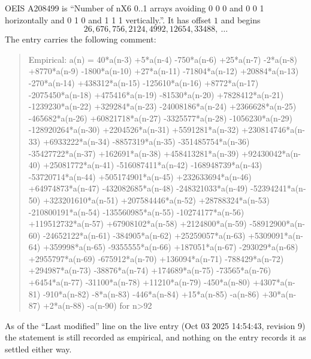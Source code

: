 \documentclass[11pt,a4paper]{article}
\theoremstyle{plain}
\theoremstyle{definition}
\begin{document}
OEIS A208499 is ``Number of nX6 0..1 arrays avoiding 0 0 0 and 0 0 1 horizontally and 0 1 0 and 1 1 1 vertically.''. It has offset
$1$ and begins
\[
26, 676, 756, 2124, 4992, 12654, 33488,\ \dots
\]
The entry carries the following comment:
\begin{quote}\small
Empirical: a(n) = 40*a(n-3) +5*a(n-4) -750*a(n-6) +25*a(n-7) -2*a(n-8) +8770*a(n-9) -1800*a(n-10) +27*a(n-11) -71804*a(n-12) +20884*a(n-13) -270*a(n-14) +438312*a(n-15) -125610*a(n-16) +8772*a(n-17) -2075450*a(n-18) +475416*a(n-19) -81530*a(n-20) +7828412*a(n-21) -1239230*a(n-22) +329284*a(n-23) -24008186*a(n-24) +2366628*a(n-25) -465682*a(n-26) +60821718*a(n-27) -3325577*a(n-28) -1056230*a(n-29) -128920264*a(n-30) +2204526*a(n-31) +5591281*a(n-32) +230814746*a(n-33) +6933222*a(n-34) -8857319*a(n-35) -351485754*a(n-36) -35427722*a(n-37) +162691*a(n-38) +458413281*a(n-39) +92430042*a(n-40) +25081772*a(n-41) -516087411*a(n-42) -168948739*a(n-43) -53720714*a(n-44) +505174901*a(n-45) +232633694*a(n-46) +64974873*a(n-47) -432082685*a(n-48) -248321033*a(n-49) -52394241*a(n-50) +323201610*a(n-51) +207584446*a(n-52) +28788324*a(n-53) -210800191*a(n-54) -135560985*a(n-55) -10274177*a(n-56) +119512732*a(n-57) +67908102*a(n-58) +2124800*a(n-59) -58912900*a(n-60) -24652122*a(n-61) -384905*a(n-62) +25259057*a(n-63) +5309091*a(n-64) +359998*a(n-65) -9355555*a(n-66) +187051*a(n-67) -293029*a(n-68) +2955797*a(n-69) -675912*a(n-70) +136094*a(n-71) -788429*a(n-72) +294987*a(n-73) -38876*a(n-74) +174689*a(n-75) -73565*a(n-76) +6454*a(n-77) -31100*a(n-78) +11210*a(n-79) -450*a(n-80) +4307*a(n-81) -910*a(n-82) -8*a(n-83) -446*a(n-84) +15*a(n-85) -a(n-86) +30*a(n-87) +2*a(n-88) -a(n-90) for n>92
\end{quote}
As of the ``Last modified'' line on the live entry (Oct 03 2025 14:54:43, revision
9) the statement is still recorded as empirical, and nothing on the entry
records it as settled either way.
\end{document}
